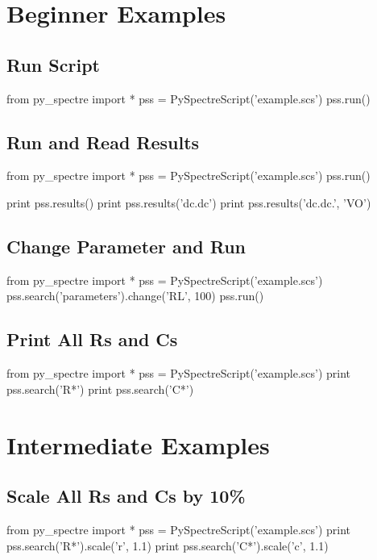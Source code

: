 \documentclass[a4paper,12pt]{article}
\begin{document}
\section{Beginner Examples}
\subsection{Run Script}
\begin{python}
from py_spectre import *
pss = PySpectreScript('example.scs')
pss.run()
\end{python}

\subsection{Run and Read Results}
\begin{python}
from py_spectre import *
pss = PySpectreScript('example.scs')
pss.run()

print pss.results()
print pss.results('dc.dc')
print pss.results('dc.dc.', 'VO')
\end{python}


\subsection{Change Parameter and Run}
\begin{python}
from py_spectre import *
pss = PySpectreScript('example.scs')
pss.search('parameters').change('RL', 100)
pss.run()
\end{python}

\subsection{Print All Rs and Cs}
\begin{python}
from py_spectre import *
pss = PySpectreScript('example.scs')
print pss.search('R*')
print pss.search('C*')
\end{python}

\newpage
\section{Intermediate Examples}
\subsection{Scale All Rs and Cs by 10\%}
\begin{python}
from py_spectre import *
pss = PySpectreScript('example.scs')
print pss.search('R*').scale('r', 1.1)
print pss.search('C*').scale('c', 1.1)
\end{python}
\end{document}

